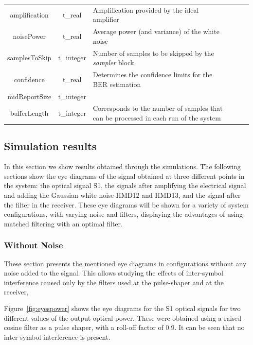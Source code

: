 \begin{refsection}
\begin{table}[H]
\begin{tabular}{|c|c|p{70mm}|ccp{70mm}}
		amplification & t\_real & Amplification provided by the ideal amplifier &    \\ \cline{1-3}
		noisePower & t\_real & Average power (and variance) of the white noise &    \\ \cline{1-3}
		samplesToSkip & t\_integer & Number of samples to be skipped by the \textit{sampler} block &    \\ \cline{1-3}
		confidence & t\_real & Determines the confidence limits for the BER estimation &    \\ \cline{1-3}
		midReportSize & t\_integer &  &    \\ \cline{1-3}
		bufferLength & t\_integer & Corresponds to the number of samples that can be processed in each run of the system &    \\ \cline{1-3}
		\end{tabular}
		\label{table:in_par}
		\end{table}

\subsection*{Simulation results}

In this section we show results obtained through the simulations. The
following sections show the eye diagrams of the signal obtained at three
different points in the system: the optical signal S1, the signals after
amplifying the electrical signal and adding the Gaussian white noise HMD12 and
HMD13, and the signal after the filter in the receiver. These eye diagrams will
be shown for a variety of system configurations, with varying noise and
filters, displaying the advantages of using matched filtering with an optimal
filter.

\subsubsection{Without Noise}

These section presents the mentioned eye diagrams in configurations without any
noise added to the signal. This allows studying the effects of inter-symbol
interference caused only by the filters used at the pulse-shaper and at the
receiver,

Figure~\ref{fig:eyespower} shows the eye diagrams for the S1 optical signals
for two different values of the output optical power. These were obtained using
a
raised-cosine filter as a pulse shaper, with a roll-off factor of 0.9. It can
be seen that no inter-symbol interference is present.


\end{refsection}
